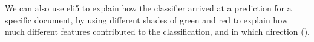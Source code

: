 
We can also use eli5 to explain how the classifier arrived at a
prediction for a specific document, by using different shades of green
and red to explain how much different features contributed to the
classification, and in which direction ().




